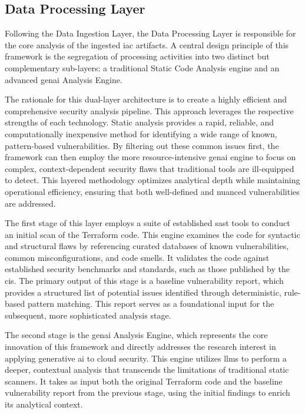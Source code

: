 
\subsection{Data Processing Layer} %
\label{sec:data-processing-layer}

Following the Data Ingestion Layer, the Data Processing Layer is responsible for the core analysis of the ingested \gls{iac} artifacts. A central design principle of this framework is the segregation of processing activities into two distinct but complementary sub-layers: a traditional Static Code Analysis engine and an advanced \gls{genai} Analysis Engine.

The rationale for this dual-layer architecture is to create a highly efficient and comprehensive security analysis pipeline. This approach leverages the respective strengths of each technology. Static analysis provides a rapid, reliable, and computationally inexpensive method for identifying a wide range of known, pattern-based vulnerabilities. By filtering out these common issues first, the framework can then employ the more resource-intensive \gls{genai} engine to focus on complex, context-dependent security flaws that traditional tools are ill-equipped to detect. This layered methodology optimizes analytical depth while maintaining operational efficiency, ensuring that both well-defined and nuanced vulnerabilities are addressed.

The first stage of this layer employs a suite of established \gls{sast} tools to conduct an initial scan of the Terraform code. This engine examines the code for syntactic and structural flaws by referencing curated databases of known vulnerabilities, common misconfigurations, and code smells. It validates the code against established security benchmarks and standards, such as those published by the \gls{cis}. The primary output of this stage is a baseline vulnerability report, which provides a structured list of potential issues identified through deterministic, rule-based pattern matching. This report serves as a foundational input for the subsequent, more sophisticated analysis stage.

The second stage is the \gls{genai} Analysis Engine, which represents the core innovation of this framework and directly addresses the research interest in applying generative \gls{ai} to cloud security. This engine utilizes \glspl{llm} to perform a deeper, contextual analysis that transcends the limitations of traditional static scanners\cite{hayagreevan_security_2024, ling_enhancing_2024}. It takes as input both the original Terraform code and the baseline vulnerability report from the previous stage, using the initial findings to enrich its analytical context.

